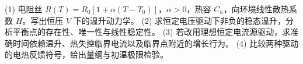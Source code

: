 (1) 电阻丝 \(R(T)=R_0[1+\alpha(T-T_0)]\)，\(\alpha>0\)，热容 \(C_h\)，向环境线性散热系数 \(H\)。写出恒压 \(V\) 下的温升动力学。
(2) 求恒定电压驱动下非负的稳态温升，分析平衡点的存在性、唯一性与线性稳定性。
(3) 若改用理想恒定电流源驱动，求准确时间依赖温升、热失控临界电流以及临界点附近的增长行为。
(4) 比较两种驱动的电热反馈符号，给出量纲与初温极限检验。

